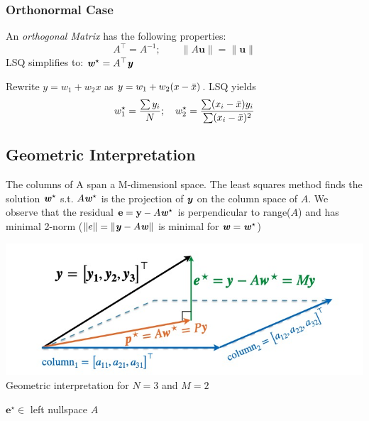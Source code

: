    \subsubsection{Orthonormal Case}
        An \textit{orthogonal Matrix} has the following properties:
        \begin{equation*}
            A^\top = A^{-1}; \qquad \|A\mathbf{u}\| = \|\mathbf{u}\|
        \end{equation*}
        LSQ simplifies to:
            $\textbf{\textit{w}}^\star = A^\top\textbf{\textit{y}}$
        
        Rewrite $y = w_1 + w_2x$ as $y = w_1 + w_2(x-\Bar{x})$. LSQ yields
        \begin{equation*}
            w_1^\star = \frac{\sum y_i}{N}; \quad w_2^\star = \frac{\sum(x_i - \Bar{x})y_i}{\sum(x_i - \Bar{x})^2}
        \end{equation*}
    \subsection{Geometric Interpretation}
        The columns of A span a M-dimensionl space. The least squares method finds the solution $\textbf{\textit{w}}^\star$ s.t. $A\textbf{\textit{w}}^\star$ is the projection of $\textbf{\textit{y}}$ on the column space of $A$.
        We observe that the residual $\mathbf{e} = \mathbf{y}-A\textbf{\textit{w}}^\star$ is perpendicular to  range($A$) and has minimal 2-norm ($\|e\|=\|\textbf{\textit{y}}-A\textbf{\textit{w}}\|$ is minimal for $\textbf{\textit{w}} = \textbf{\textit{w}}^\star$)
        \begin{center}
            \includegraphics[width = 0.7\linewidth]{images/01/geometric_interpretation.jpg}\\
            Geometric interpretation for $N=3$ and $M = 2$
        \end{center}
        
        $\mathbf{e}^\star\in$ left nullspace $A$
        
